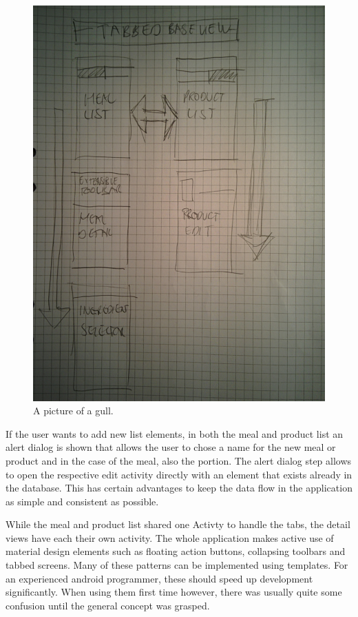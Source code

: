 \documentclass[a4paper,11pt,twoside]{article}
\begin{document}
\begin{figure}

  \centering
    \includegraphics[width=\textwidth]{images/design_draft.jpg}
    \caption{A picture of a gull.}
    \label{fig:design_draft}
\end{figure}


If the user wants to add new list elements, in both the meal and product list an
alert dialog is shown that allows the user to chose a name for the new meal or
product and in the case of the meal, also the portion. The alert dialog step allows
to open the respective edit activity directly with an element that exists already
in the database. This has certain advantages to keep the data flow in the application
as simple and consistent as possible.

While the meal and product list shared one Activty to handle the tabs, the detail
views have each their own activity. The whole application makes active use of
material design elements such as floating action buttons, collapsing toolbars
and tabbed screens. Many of these patterns can be implemented using templates. For an
experienced android programmer, these should speed up development significantly.
When using them first time however, there was usually quite some confusion until
the general concept was grasped.
\end{document}
